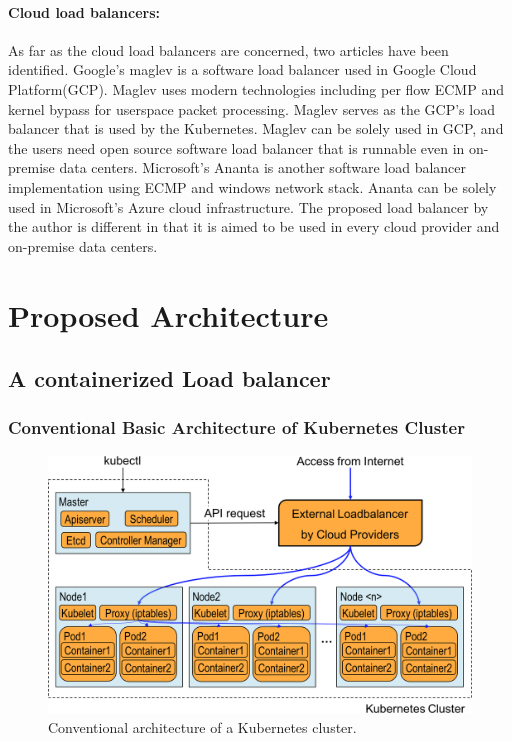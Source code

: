 \paragraph{\bf Cloud load balancers:}

As far as the cloud load balancers are concerned, two articles have been identified.
Google's maglev\cite{eisenbud2016maglev} is a software load balancer used in Google Cloud Platform(GCP)\cite{Voellm2013}.
Maglev uses modern technologies including per flow ECMP and kernel bypass for userspace packet processing.
Maglev serves as the GCP's load balancer that is used by the Kubernetes.
Maglev can be solely used in GCP, and the users need open source software load balancer that is runnable even in on-premise data centers.
Microsoft's Ananta\cite{patel2013ananta} is another software load balancer implementation using ECMP and windows network stack.
Ananta can be solely used in Microsoft's Azure cloud infrastructure\cite{patel2013ananta}.
The proposed load balancer by the author is different in that it is aimed to be used in every cloud provider and on-premise data centers.

\section{Proposed Architecture}\label{Architecture}

\subsection{A containerized Load balancer}

\subsubsection{Conventional Basic Architecture of Kubernetes Cluster}


\begin{figure}
\includegraphics[width=\columnwidth]{Figs/K8sConventional}
\caption{Conventional architecture of a Kubernetes cluster.}
\label{fig:K8sConventional}
\end{figure}


